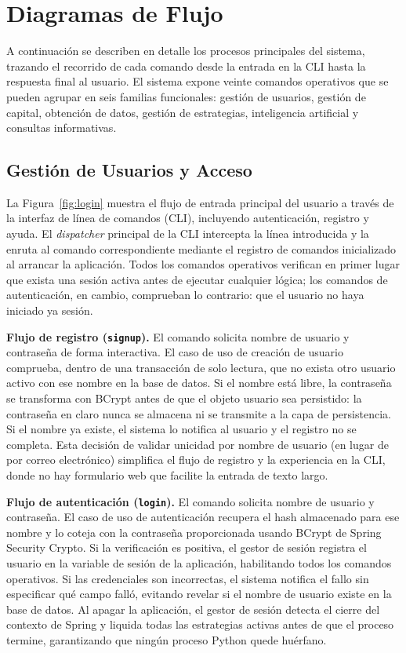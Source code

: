 
\section{Diagramas de Flujo}
A continuación se describen en detalle los procesos principales del sistema,
trazando el recorrido de cada comando desde la entrada en la CLI hasta la
respuesta final al usuario. El sistema expone veinte comandos operativos que
se pueden agrupar en seis familias funcionales: gestión de usuarios, gestión
de capital, obtención de datos, gestión de estrategias, inteligencia artificial
y consultas informativas.

\subsection{Gestión de Usuarios y Acceso}

La Figura~\ref{fig:login} muestra el flujo de entrada principal del usuario
a través de la interfaz de línea de comandos (CLI), incluyendo autenticación,
registro y ayuda. El \textit{dispatcher} principal de la CLI intercepta la
línea introducida y la enruta al comando correspondiente mediante el registro
de comandos inicializado al arrancar la aplicación. Todos los comandos
operativos verifican en primer lugar que exista una sesión activa antes de
ejecutar cualquier lógica; los comandos de autenticación, en cambio,
comprueban lo contrario: que el usuario no haya iniciado ya sesión.

\textbf{Flujo de registro (\texttt{signup}).}
El comando solicita nombre de usuario y contraseña de forma interactiva.
El caso de uso de creación de usuario comprueba, dentro de una transacción de
solo lectura, que no exista otro usuario activo con ese nombre en la base de
datos. Si el nombre está libre, la contraseña se transforma con BCrypt antes
de que el objeto usuario sea persistido: la contraseña en claro nunca se
almacena ni se transmite a la capa de persistencia. Si el nombre ya existe,
el sistema lo notifica al usuario y el registro no se completa. Esta decisión
de validar unicidad por nombre de usuario (en lugar de por correo electrónico)
simplifica el flujo de registro y la experiencia en la CLI, donde no hay
formulario web que facilite la entrada de texto largo.

\textbf{Flujo de autenticación (\texttt{login}).}
El comando solicita nombre de usuario y contraseña. El caso de uso de
autenticación recupera el hash almacenado para ese nombre y lo coteja con la
contraseña proporcionada usando BCrypt de Spring Security Crypto. Si la
verificación es positiva, el gestor de sesión registra el usuario en la
variable de sesión de la aplicación, habilitando todos los comandos
operativos. Si las credenciales son incorrectas, el sistema notifica el fallo
sin especificar qué campo falló, evitando revelar si el nombre de usuario
existe en la base de datos. Al apagar la aplicación, el gestor de sesión
detecta el cierre del contexto de Spring y liquida todas las estrategias
activas antes de que el proceso termine, garantizando que ningún proceso
Python quede huérfano.

